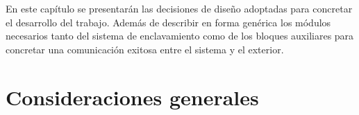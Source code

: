% 
%
%
%
%
%
%
%
%
%	
%		
%
%		
%		
%		
%		


En este capítulo se presentarán las decisiones de diseño adoptadas para concretar el desarrollo del trabajo. Además de describir en forma genérica los módulos necesarios tanto del sistema de enclavamiento como de los bloques auxiliares para concretar una comunicación exitosa entre el sistema y el exterior.

\section{Consideraciones generales}

